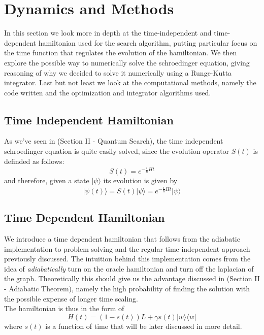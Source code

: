 \documentclass[aps,pra,reprint, onecolumn, showkeys]{revtex4-2}
\begin{document}
\section{Dynamics and Methods}
In this section we look more in depth at the time-independent and time-dependent hamiltonian used for the search algorithm, putting particular focus on the time function that regulates the evolution of the hamiltonian. We then explore the possible way to numerically solve the schroedinger equation, giving reasoning of why we decided to solve it numerically using a Runge-Kutta integrator. Last but not least we look at the computational methods, namely the code written and the optimization and integrator algorithms used.

\subsection{Time Independent Hamiltonian}
As we've seen in (Section II - Quantum Search), the time independent schroedinger equation is quite easily solved, since the evolution operator $S(t)$ is definded as follows:
\begin{equation}
S(t) = e^{-\frac{i}{\hbar}Ht}
\end{equation}
and therefore, given a state $|\psi\rangle$ its evolution is given by
\begin{equation}
|\psi(t)\rangle = S(t)|\psi\rangle = e^{-\frac{i}{\hbar}Ht}|\psi\rangle
\end{equation}


\subsection{Time Dependent Hamiltonian}
We introduce a time dependent hamiltonian that follows from the adiabatic implementation to problem solving and the regular time-independent approach previously discussed. The intuition behind this implementation comes from the idea of \textit{adiabatically} turn on the oracle hamiltonian and turn off the laplacian of the graph. Theoretically this should give us the advantage discussed in (Section II - Adiabatic Theorem), namely the high probability of finding the solution with the possible expense of longer time scaling. \\
The hamiltonian is thus in the form of
\begin{equation}
H(t) = (1-s(t))L + \gamma s(t)|w\rangle\langle w|
\end{equation}
where $s(t)$ is a function of time that will be later discussed in more detail.
\end{document}
